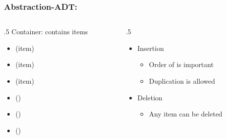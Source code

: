 \documentclass{beamer}
\begin{document}
\begin{frame}\frametitle{Abstraction-ADT: }
	\begin{columns}[T] %
	\begin{column}{.5\linewidth} %
	    	Container: contains items
		\begin{itemize}
			\item {}(item)
			\item {}(item)
			\item {}(item)
			\item {}()
			\item {}()
			\item {}()			
		\end{itemize}
	\end{column} %
	\begin{column}{.5\linewidth} %
		\begin{itemize}

			\item
			Insertion
			\begin{itemize}
				\item
				Order of is  important
	
				\item
				Duplication is allowed
			\end{itemize}

			\item
			Deletion
			\begin{itemize}
				\item
				Any item can be deleted
			\end{itemize}
		\end{itemize}
	\end{column} %
	\end{columns} %
\end{frame}




\end{document}
